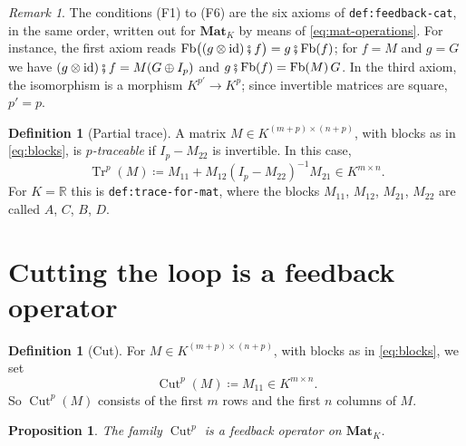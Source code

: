 \documentclass[11pt,a4paper]{article}
\theoremstyle{plain}
\newtheorem{proposition}[theorem]{Proposition}
\theoremstyle{definition}
\newtheorem{definition}[theorem]{Definition}
\theoremstyle{remark}
\newtheorem{remark}[theorem]{Remark}
\DeclareMathOperator{\Fb}{Fb}
\DeclareMathOperator{\Tr}{Tr}
\DeclareMathOperator{\Cut}{Cut}
\newcommand{\R}{\mathbb{R}}
\newcommand{\id}{\mathrm{id}}
\newcommand{\then}{\mathbin{\fatsemi}}
\newcommand{\Mat}{\mathbf{Mat}}
\newcommand{\lbl}[1]{\nolinkurl{#1}}
\begin{document}
\begin{remark}
    \label{rem:axioms}
    The conditions (F1) to (F6) are the six axioms of \lbl{def:feedback-cat}, in the same order, written out for $\Mat_K$ by means of \cref{eq:mat-operations}.
    For instance, the first axiom reads $\Fb\bigl( (g \otimes \id) \then f \bigr) = g \then \Fb(f)$; for $f = M$ and $g = G$ we have $(g \otimes \id) \then f = M (G \oplus I_p)$ and $g \then \Fb(f) = \Fb(M)\, G$.
    In the third axiom, the isomorphism is a morphism $K^{p'} \to K^{p}$; since invertible matrices are square, $p' = p$.
\end{remark}

\begin{definition}[Partial trace]
    \label{def:tr}
    A matrix $M \in K^{(m+p) \times (n+p)}$, with blocks as in \cref{eq:blocks}, is \emph{$p$-traceable} if $I_p - M_{22}$ is invertible.
    In this case,
    \begin{equation}
        \label{eq:tr}
        \Tr^p(M) \coloneqq M_{11} + M_{12} (I_p - M_{22})^{-1} M_{21} \in K^{m \times n} .
    \end{equation}
    For $K = \R$ this is \lbl{def:trace-for-mat}, where the blocks $M_{11}$, $M_{12}$, $M_{21}$, $M_{22}$ are called $A$, $C$, $B$, $D$.
\end{definition}

\section{Cutting the loop is a feedback operator}

\begin{definition}[Cut]
    \label{def:cut}
    For $M \in K^{(m+p) \times (n+p)}$, with blocks as in \cref{eq:blocks}, we set
    \begin{equation}
        \Cut^p(M) \coloneqq M_{11} \in K^{m \times n} .
    \end{equation}
    So $\Cut^p(M)$ consists of the first $m$ rows and the first $n$ columns of $M$.
\end{definition}

\begin{proposition}
    \label{prop:cut}
    The family $\Cut^p$ is a feedback operator on $\Mat_K$.
\end{proposition}
\end{document}
